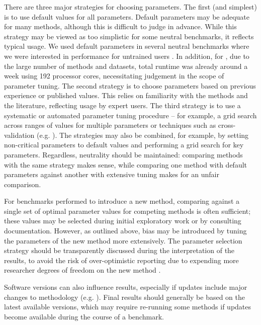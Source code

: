 There are three major strategies for choosing parameters. The first (and simplest) is to use default values for all parameters. Default parameters may be adequate for many methods, although this is difficult to judge in advance. While this strategy may be viewed as too simplistic for some neutral benchmarks, it reflects typical usage. We used default parameters in several neutral benchmarks where we were interested in performance for untrained users \cite{saelens_comparisonsinglecelltrajectory_2019,couronne_randomforestlogistic_2018,schneider_mortalityriskacute_2016}. In addition, for \cite{saelens_comparisonsinglecelltrajectory_2019}, due to the large number of methods and datasets, total runtime was already around a week using 192 processor cores, necessitating judgement in the scope of parameter tuning. The second strategy is to choose parameters based on previous experience or published values. This relies on familiarity with the methods and the literature, reflecting usage by expert users. The third strategy is to use a systematic or automated parameter tuning procedure -- for example, a grid search across ranges of values for multiple parameters or techniques such as cross-validation (e.g. \cite{saelens_comprehensiveevaluationmodule_2018}). The strategies may also be combined, for example, by setting non-critical parameters to default values and performing a grid search for key parameters. Regardless, neutrality should be maintained: comparing methods with the same strategy makes sense, while comparing one method with default parameters against another with extensive tuning makes for an unfair comparison.

For benchmarks performed to introduce a new method, comparing against a single set of optimal parameter values for competing methods is often sufficient; these values may be selected during initial exploratory work or by consulting documentation. However, as outlined above, bias may be introduced by tuning the parameters of the new method more extensively. The parameter selection strategy should be transparently discussed during the interpretation of the results, to avoid the risk of over-optimistic reporting due to expending more researcher degrees of freedom on the new method \cite{boulesteix_tensimplerules_2015,hu_parametertuningkey_2019}.

Software versions can also influence results, especially if updates include major changes to methodology (e.g. \cite{vaquero-garcia_leafcuttervsmajiq_2018}). Final results should generally be based on the latest available versions, which may require re-running some methods if updates become available during the course of a benchmark.

